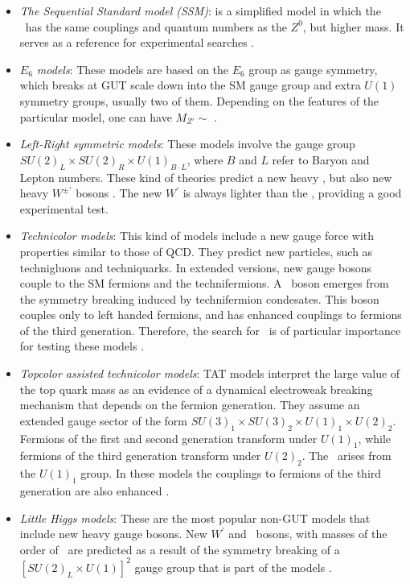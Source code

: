 \begin{itemize}
 \item \textit{The Sequential Standard model (SSM)}: is a simplified model in which the \Zprime~has the same 
couplings and quantum numbers as the $Z^{0}$, but higher mass. It serves as a 
reference for experimental searches \cite{bib:SSM}.

 \item \textit{$E_{6}$ models}: These models are based on the $E_{6}$ group as gauge symmetry,
which breaks at GUT scale down into the SM gauge group and extra $U(1)$ symmetry 
groups, usually two of them. Depending on the features of the 
particular model, one can have $M_{Z\prime} \sim$ \TeV \cite{E6models}.

 \item \textit{Left-Right symmetric models}: These models involve the gauge group $SU(2)_{L}\times SU(2)_{R} \times U(1)_{B\cdot L}$,
where $B$ and $L$ refer to Baryon and Lepton numbers. These kind of theories 
predict a new heavy \Zprime, but also new heavy $W^{\pm \prime}$ bosons \cite{leftrightmodels}. The new 
$W^{\prime}$ is always lighter than the \Zprime, providing a good experimental test.

 \item \textit{Technicolor models}: This kind of models include a new gauge force with properties 
similar to those of QCD. They predict new particles, such as technigluons and 
techniquarks. In extended versions, new gauge bosons couple to the 
SM fermions and the technifermions. A \Zprime~boson emerges from the symmetry 
breaking induced by technifermion condesates. This boson couples only to 
left handed fermions, and has enhanced couplings to fermions of the 
third generation. Therefore, the search for \Zprimetotautau~is
of particular importance for testing these models \cite{Technicolor}.

 \item \textit{Topcolor assisted technicolor models}: TAT models interpret the large 
value of the top quark mass as an evidence 
of a dynamical electroweak breaking mechanism that depends on the fermion 
generation. They assume an extended gauge sector of the form 
$SU(3)_{1}\times SU(3)_{2} \times U(1)_{1}\times U(2)_{2}$. Fermions of
the first and second generation transform under $U(1)_{1}$, while 
fermions of the third generation transform under $U(2)_{2}$. The \Zprime~arises 
from the $U(1)_{1}$ group. In these models the couplings to fermions
of the third generation are also enhanced \cite{ZprimeThirdGeneration,TAT}.

 \item \textit{Little Higgs models}: These are the most popular non-GUT models that include 
new heavy gauge bosons. New $W^{\prime}$ and \Zprime~bosons, with masses of 
the order of \TeV~are predicted as a result of the symmetry 
breaking of a $[SU(2)_{L}\times U(1)]^{2}$ gauge group that is part of the models \cite{LittleHiggs1,LittleHiggs2}.

\end{itemize}







